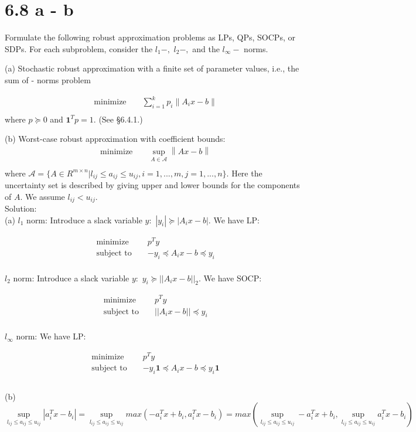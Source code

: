 \documentclass{article}
\begin{document}
\section*{6.8 a - b} %
Formulate the following robust approximation problems as LPs, QPs, SOCPs, or SDPs. For each subproblem, consider the $l_1 - ,$  $l_2 - ,$ and the $l_{\infty} - $ norms.

(a) Stochastic robust approximation with a finite set of parameter values, i.e., the sum of - norms problem

\begin{align*}
&\text{minimize } && 
\sum_{i = 1}^k
p_i\left\lVert A_ix - b\right\lVert  \\
\end{align*}
where $p \succeq 0$ and $\boldsymbol{1}^Tp = 1.$ 
(See \S6.4.1.)

(b) Worst-case robust approximation with coefficient bounds:
\begin{align*}
&\text{minimize } && 
\sup_{A \in \mathcal{A}}
\left\lVert Ax - b\right\lVert  \\
\end{align*}
where $\mathcal{A} = \{A \in R^{m\times n} | 
l_{ij} \leq a_{ij} \leq u_{ij}, i = 1, ..., m, 
	j = 1, ... , n\}.$ Here the uncertainty set is described by giving upper and lower bounds for the
components of $A$. We assume $l_{ij} < u_{ij}.$ \\

Solution:\\
(a) $l_1$ norm: Introduce a slack variable $y: $ 
$|y_i| \succeq |A_i x - b|.$ We have LP:

\begin{align*}
&\text{minimize } && 
p^Ty \\
&\text{subject to }
&& -y_i \preceq A_ix - b \preceq y_i \\
\end{align*}

$l_2$ norm: Introduce a slack variable $y: $ 
$y_i \succeq ||A_i x - b||_2.$ We have SOCP:

\begin{align*}
&\text{minimize } && 
p^Ty \\
&\text{subject to }
&& ||A_ix - b|| \preceq y_i \\
\end{align*}

$l_{\infty}$ norm:  We have LP:

\begin{align*}
&\text{minimize } && 
p^Ty \\
&\text{subject to }
&& -y_i \boldsymbol{1} \preceq A_ix - b 
\preceq y_i  \boldsymbol{1}\\
\end{align*}
\\
(b) 
$$
\sup_{l_{ij} \leq a_{ij} \leq u_{ij}} |a_i^Tx - b_i| = 
\sup_{l_{ij} \leq a_{ij} \leq u_{ij}} 
max(- a_i^Tx + b_i, a_i^Tx - b_i) = 
max(\sup_{l_{ij} \leq a_{ij} \leq u_{ij}} - a_i^Tx + b_i, 
\sup_{l_{ij} \leq a_{ij} \leq u_{ij}} a_i^Tx - b_i)
$$
\end{document}
